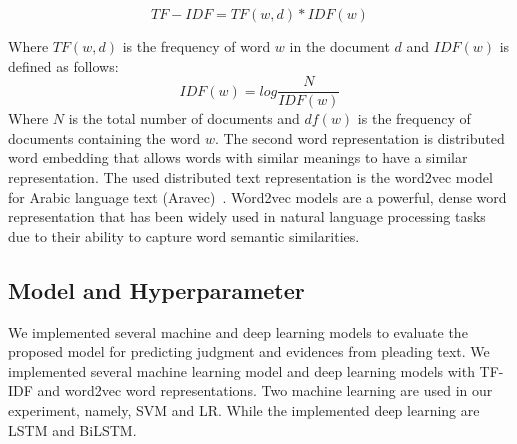 \documentclass[sn-mathphys,Numbered]{sn-jnl}%
\theoremstyle{thmstyleone}%
\theoremstyle{thmstyletwo}%
\theoremstyle{thmstylethree}%
\begin{document}
\begin{equation}
TF-IDF=TF(w,d)*IDF(w)
\end{equation}

Where $TF(w, d)$ is the frequency of word $w$ in the document $d$ and $IDF(w)$ is defined as follows:
\begin{equation}
IDF(w)=log\frac{N}{IDF(w)}
\end{equation}
Where $N$ is the total number of documents and $df(w)$ is the frequency of documents containing the word $w$. 
The second word representation is distributed word embedding that allows words with similar meanings to have a similar representation. The used distributed text representation is the word2vec model for Arabic language text (Aravec)~\cite{soliman2017aravec}. Word2vec models are a powerful, dense word representation that has been widely used in natural language processing tasks due to their ability to capture word semantic similarities.

\subsection{Model and Hyperparameter}

We implemented several machine and deep learning models to evaluate the proposed model for predicting judgment and evidences from pleading text. We implemented several machine learning model and deep learning models with TF-IDF and word2vec word representations. Two machine learning are used in our experiment, namely, SVM and LR. While the implemented deep learning are LSTM and BiLSTM.   
\end{document}
